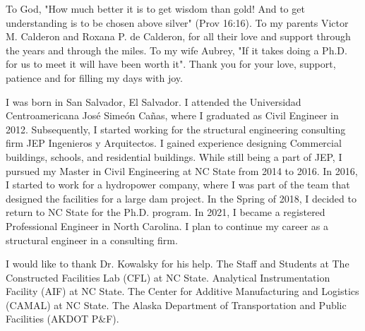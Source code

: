 \maketitlepage

\begin{dedication}
\centering
To God, "How much better it is to get wisdom than gold! And to get understanding is to be chosen above silver" (Prov 16:16). 
 \newline To my parents Victor M. Calderon and Roxana P. de Calderon, for all their love and support through the years and through the miles. 
 \newline To my wife Aubrey, "If it takes doing a Ph.D. for us to meet it will have been worth it". Thank you for your love, support, patience and for filling my days with joy.
\end{dedication}
%
\begin{biography}
I was born in San Salvador, El Salvador. I attended the Universidad Centroamericana José Simeón Cañas, where I graduated as Civil Engineer in 2012. Subsequently, I started working for the structural engineering consulting firm JEP Ingenieros y Arquitectos. I gained experience designing Commercial buildings, schools, and residential buildings. While still being a part of JEP, I pursued my Master in Civil Engineering at NC State from 2014 to 2016. In 2016, I started to work for a hydropower company, where I was part of the team that designed the facilities for a large dam project. In the Spring of 2018, I decided to return to NC State for the Ph.D. program. In 2021, I became a registered Professional Engineer in North Carolina. I plan to continue my career as a structural engineer in a consulting firm.
\end{biography}
%
\begin{acknowledgements}
I would like to thank Dr. Kowalsky for his help. The Staff and Students at The Constructed Facilities Lab (CFL) at NC State. Analytical Instrumentation Facility (AIF) at NC State. The Center for Additive Manufacturing and Logistics (CAMAL) at NC State. The Alaska Department of Transportation and Public Facilities (AKDOT P\&F).
\end{acknowledgements}


\thesistableofcontents

\thesislistoftables

\thesislistoffigures
